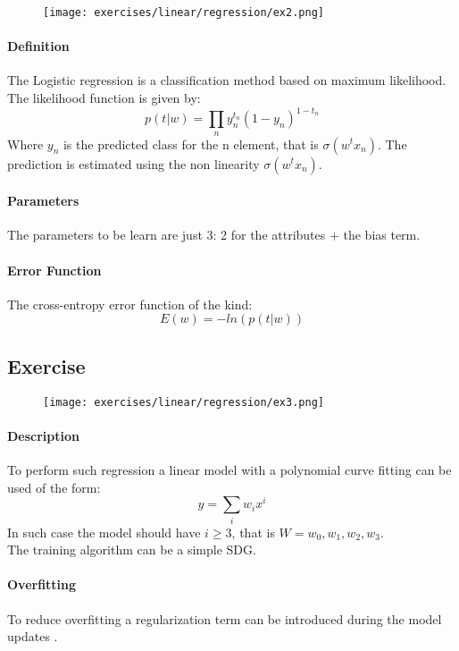 \begin{figure}[H]
    \centering
    \texttt{[image: exercises/linear/regression/ex2.png]}
\end{figure}
 
 \paragraph{Definition}
The Logistic regression is a classification method based on maximum likelihood.
The likelihood function is given by:
$$p(t|w)=\prod_n y_n^{t_n}(1-y_n)^{1-t_n}$$
Where $y_n$ is the predicted class for the n element, that is $\sigma(w^tx_n)$. The prediction is estimated using the non linearity $\sigma(w^tx_n)$.

\paragraph{Parameters}
The parameters to be learn are just 3: 2 for the attributes + the bias term.

\paragraph{Error Function}
The cross-entropy error function of the kind:
$$E(w)=-ln(p(t|w))$$

\subsection{Exercise }

\begin{figure}[H]
    \centering
    \texttt{[image: exercises/linear/regression/ex3.png]}
\end{figure}

\paragraph{Description}
To perform such regression a linear model with a polynomial curve fitting can be used of the form:
$$y=\sum_i w_ix^i$$
In such case the model should have $i \ge 3$, that is $W=w_0,w_1,w_2,w_3$.\\
The training algorithm can be a simple SDG.

\paragraph{Overfitting}
To reduce overfitting a regularization term can be introduced during the model updates .


